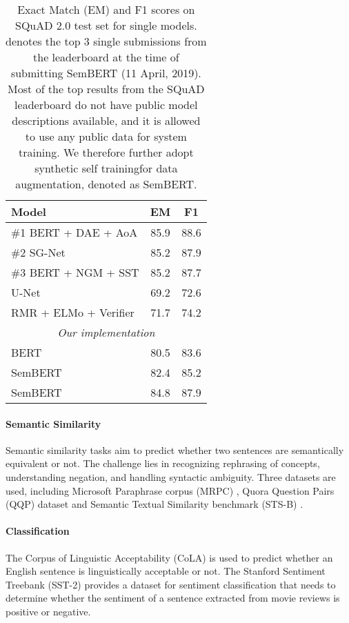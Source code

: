 \documentclass[letterpaper]{article} \usepackage{aaai20}  \usepackage{times}  \usepackage{helvet} \usepackage{courier}  \usepackage[hyphens]{url}  \usepackage{graphicx} \urlstyle{rm} \def\UrlFont{\rm}  \usepackage{graphicx}  \frenchspacing  \usepackage{amssymb}
\begin{document}
\begin{table} 
{
		\resizebox{\linewidth}{!}
	{
			\begin{tabular}{l c c}
				\hline
				
				\hline
				\textbf{Model} & \textbf{EM} & \textbf{F1}\\
				\hline
				\#1 BERT + DAE + AoA  & 85.9 & 88.6 \\
				\#2 SG-Net & 85.2 & 87.9\\
				\#3 BERT + NGM + SST & 85.2 & 87.7\\
				\hline
				U-Net \cite{sun2018u} & 69.2 & 72.6\\
				RMR + ELMo + Verifier \cite{hu2018read+}& 71.7 & 74.2 \\
				\hline
				\multicolumn{3}{c}{\emph{Our implementation}} \\
				BERT  & 80.5 & 83.6 \\
				SemBERT & 82.4	& 85.2\\
				SemBERT & 84.8	& 87.9\\
				\hline
				
				\hline
			\end{tabular}
		}
		{
			\caption{\label{tab:squad2.0} Exact Match (EM) and F1 scores on SQuAD 2.0  test set for single models.  denotes the top 3 single submissions from the leaderboard at the time of submitting SemBERT (11 April, 2019). Most of the top results from the SQuAD leaderboard do not have public model descriptions available, and it is allowed to use any public data for system training. We therefore further adopt synthetic self training\footnotemark[7] for data augmentation, denoted as SemBERT.}
		} 
}
\end{table}


\paragraph{Semantic Similarity}
Semantic similarity tasks aim to predict whether two sentences are semantically equivalent or not. The challenge lies in recognizing rephrasing of
concepts, understanding negation, and handling syntactic ambiguity. Three datasets are used, including Microsoft Paraphrase corpus (MRPC) \cite{dolan2005automatically}, Quora Question Pairs (QQP) dataset \cite{chen2018quora} and Semantic Textual Similarity benchmark (STS-B) \cite{cer2017semeval}.

\paragraph{Classification}
The Corpus of Linguistic Acceptability (CoLA) \cite{warstadt2018neural} is used to predict whether an English sentence is linguistically acceptable or not. The Stanford Sentiment Treebank (SST-2) \cite{socher2013recursive} provides a dataset for sentiment classification that needs to determine whether the sentiment of a sentence extracted from movie reviews is positive or negative.
\end{document}
